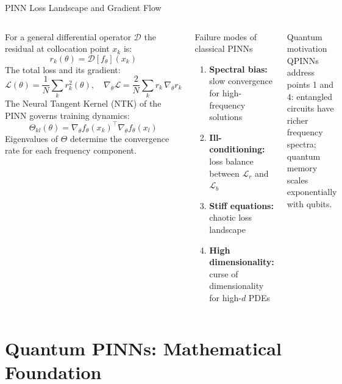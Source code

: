 \documentclass[aspectratio=169,10pt]{beamer}
\begin{document}
\begin{frame}{PINN Loss Landscape and Gradient Flow}
  \begin{columns}[T]
      For a general differential operator $\mathcal{D}$ the
      residual at collocation point $x_k$ is:
      \[
        r_k(\theta) = \mathcal{D}[f_\theta](x_k)
      \]
      The total loss and its gradient:
      \[
        \mathcal{L}(\theta)
        = \frac{1}{N}\sum_k r_k^2(\theta),\quad
        \nabla_\theta\mathcal{L}
        = \frac{2}{N}\sum_k r_k\,\nabla_\theta r_k
      \]
      The Neural Tangent Kernel (NTK) of the PINN governs
      training dynamics:
      \[
        \Theta_{kl}(\theta)
        = \nabla_\theta f_\theta(x_k)^\top
          \nabla_\theta f_\theta(x_l)
      \]
      Eigenvalues of $\Theta$ determine the convergence rate
      for each frequency component.
      \begin{alertblock}{Failure modes of classical PINNs}
        \begin{enumerate}
          \item \textbf{Spectral bias:} slow convergence for
                high-frequency solutions
          \item \textbf{Ill-conditioning:} loss balance
                between $\mathcal{L}_r$ and $\mathcal{L}_b$
          \item \textbf{Stiff equations:} chaotic loss landscape
          \item \textbf{High dimensionality:} curse of
                dimensionality for high-$d$ PDEs
        \end{enumerate}
      \end{alertblock}
      \vspace{0.2cm}
      \begin{block}{Quantum motivation}
        QPINNs address points 1 and 4: entangled circuits
        have richer frequency spectra; quantum memory scales
        exponentially with qubits.
      \end{block}
  \end{columns}
\end{frame}

\section{Quantum PINNs: Mathematical Foundation}
\end{document}
